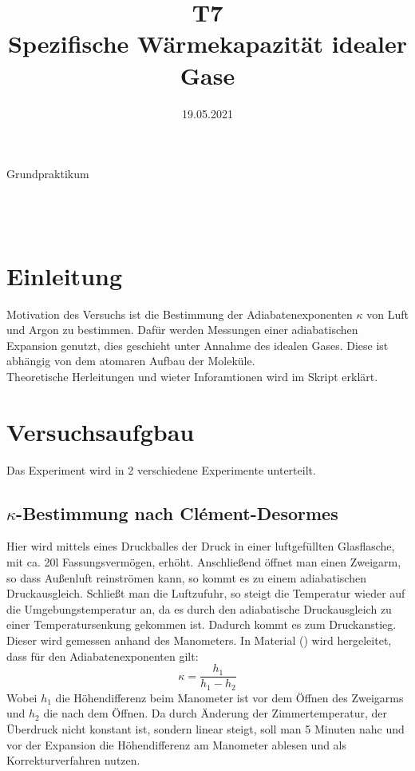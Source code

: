 \documentclass[bibliography=totocnumbered]{scrartcl}
\date{19.05.2021}
\title{T7 \\Spezifische Wärmekapazität idealer Gase}
\begin{document}
	\begin{titlepage}
		\begin{center}
			{\huge{Grundpraktikum}}\\\vspace*{15mm}
			{\huge{\textbf{\thetitle}}}\\\vspace*{20mm}
			{\theauthor}\\\vspace*{10mm}
			{\thedate}\\\vspace*{40mm}
			
			
			
			
		\end{center}
	\end{titlepage}
	\makeatother
	\restoregeometry
	\newpage
	
	\tableofcontents
    \newpage
	\listoffigures 
	\listoftables
	\newpage
	\section{Einleitung}
	Motivation des Versuchs ist die Bestimmung der Adiabatenexponenten $ \kappa $ von Luft und Argon zu bestimmen. Dafür werden Messungen einer adiabatischen Expansion genutzt, dies geschieht unter Annahme des idealen Gases. Diese ist abhängig von dem atomaren Aufbau der Moleküle. \\
	Theoretische Herleitungen und wieter Inforamtionen wird im Skript \smartcite[vgl][1f]{T7} erklärt.
	\section{Versuchsaufgbau}
	Das Experiment wird in 2 verschiedene Experimente unterteilt.
	\subsection{$\kappa$-Bestimmung nach Clément-Desormes}
	Hier wird mittels eines Druckballes der Druck in einer luftgefüllten Glasflasche, mit ca. 20l Fassungsvermögen, erhöht. Anschließend öffnet man einen Zweigarm, so dass Außenluft reinströmen kann, so kommt es zu einem adiabatischen Druckausgleich. Schließt man die Luftzufuhr, so steigt die Temperatur wieder auf die Umgebungstemperatur an, da es durch den adiabatische Druckausgleich zu einer Temperatursenkung gekommen ist. Dadurch kommt es zum Druckanstieg. Dieser wird gemessen anhand des Manometers. In Material (\cite{T7}) wird hergeleitet, dass für den Adiabatenexponenten gilt:
	\begin{equation}\label{eq: kappa eq Desormes}
		\kappa = \dfrac{h_{1}}{h_{1}-h_{2}}
	\end{equation}
	Wobei $ h_{1} $ die Höhendifferenz beim Manometer ist vor dem Öffnen des Zweigarms und $ h_{2} $ die nach dem Öffnen. Da durch Änderung der Zimmertemperatur, der Überdruck nicht konstant ist, sondern linear steigt, soll man 5 Minuten nahc und vor der Expansion die Höhendifferenz am Manometer ablesen und als Korrekturverfahren nutzen.
\end{document}
